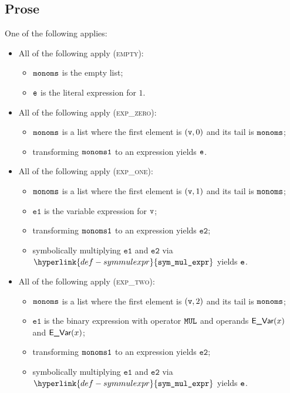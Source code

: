 \documentclass{book}
\newcommand\symmulexpr[0]{\hyperlink{def-symmulexpr}{\texttt{sym\_mul\_expr}}}
\newcommand\veone[0]{\texttt{e1}}
\newcommand\vetwo[0]{\texttt{e2}}
\begin{document}
\subsection{Prose}
One of the following applies:
\begin{itemize}
  \item All of the following apply (\textsc{empty}):
  \begin{itemize}
    \item $\texttt{monoms}$ is the empty list;
    \item $\texttt{e}$ is the literal expression for $1$.
  \end{itemize}

  \item All of the following apply (\textsc{exp\_zero}):
  \begin{itemize}
    \item $\texttt{monoms}$ is a list where the first element is $(\texttt{v}, 0)$ and its tail is $\texttt{monoms}$;
    \item transforming $\texttt{monoms1}$ to an expression yields $\texttt{e}$.
  \end{itemize}

  \item All of the following apply (\textsc{exp\_one}):
  \begin{itemize}
    \item $\texttt{monoms}$ is a list where the first element is $(\texttt{v}, 1)$ and its tail is $\texttt{monoms}$;
    \item $\veone$ is the variable expression for $\texttt{v}$;
    \item transforming $\texttt{monoms1}$ to an expression yields $\vetwo$;
    \item symbolically multiplying $\veone$ and $\vetwo$ via $\symmulexpr$ yields $\texttt{e}$.
  \end{itemize}

  \item All of the following apply (\textsc{exp\_two}):
  \begin{itemize}
    \item $\texttt{monoms}$ is a list where the first element is $(\texttt{v}, 2)$ and its tail is $\texttt{monoms}$;
    \item $\veone$ is the binary expression with operator $\texttt{MUL}$ and operands $\textsf{E\_Var}(x)$ and $\textsf{E\_Var}(x)$;
    \item transforming $\texttt{monoms1}$ to an expression yields $\vetwo$;
    \item symbolically multiplying $\veone$ and $\vetwo$ via $\symmulexpr$ yields $\texttt{e}$.
  \end{itemize}


\end{itemize}
\end{document}
